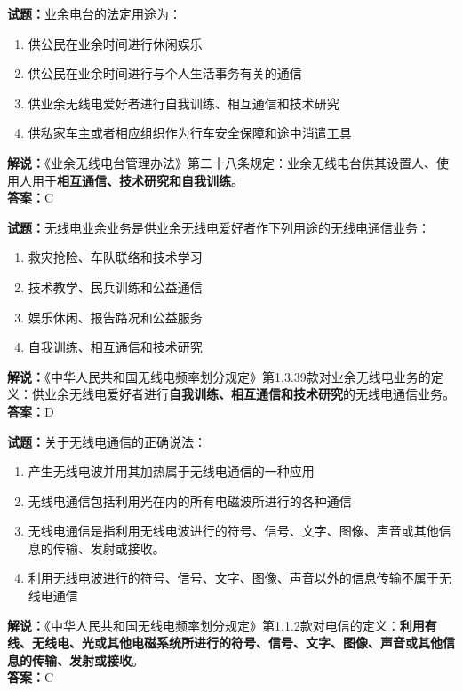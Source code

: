 \documentclass{ctexbook}
\begin{document}
\bigskip


\noindent\textbf{试题：}业余电台的法定用途为：
\begin{enumerate}[leftmargin=3em]
\item 供公民在业余时间进行休闲娱乐
\item 供公民在业余时间进行与个人生活事务有关的通信
\item 供业余无线电爱好者进行自我训练、相互通信和技术研究
\item 供私家车主或者相应组织作为行车安全保障和途中消遣工具
\end{enumerate}
\noindent\textbf{解说：}《业余无线电台管理办法》第二十八条规定：业余无线电台供其设置人、使用人用于\textbf{相互通信、技术研究和自我训练}。\\\noindent\textbf{答案：}C

\bigskip


\noindent\textbf{试题：}无线电业余业务是供业余无线电爱好者作下列用途的无线电通信业务：
\begin{enumerate}[leftmargin=3em]
\item 救灾抢险、车队联络和技术学习
\item 技术教学、民兵训练和公益通信
\item 娱乐休闲、报告路况和公益服务
\item 自我训练、相互通信和技术研究
\end{enumerate}
\noindent\textbf{解说：}《中华人民共和国无线电频率划分规定》第1.3.39款对业余无线电业务的定义：供业余无线电爱好者进行\textbf{自我训练、相互通信和技术研究}的无线电通信业务。\\\noindent\textbf{答案：}D

\bigskip


\noindent\textbf{试题：}关于无线电通信的正确说法：
\begin{enumerate}[leftmargin=3em]
\item 产生无线电波并用其加热属于无线电通信的一种应用
\item 无线电通信包括利用光在内的所有电磁波所进行的各种通信
\item 无线电通信是指利用无线电波进行的符号、信号、文字、图像、声音或其他信息的传输、发射或接收。
\item 利用无线电波进行的符号、信号、文字、图像、声音以外的信息传输不属于无线电通信
\end{enumerate}
\noindent\textbf{解说：}《中华人民共和国无线电频率划分规定》第1.1.2款对电信的定义：\textbf{利用有线、无线电、光或其他电磁系统所进行的符号、信号、文字、图像、声音或其他信息的传输、发射或接收}。\\\noindent\textbf{答案：}C
\end{document}
